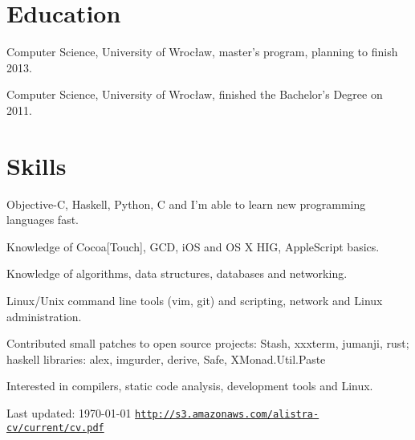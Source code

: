 \documentclass[letterpaper]{article}
\renewenvironment{itemize}{
  \begin{list}{}{
    \setlength{\leftmargin}{1.5em}
  }
}{
  \end{list}
}
\begin{document}
\section*{Education}

\begin{itemize}
  	\item Computer Science, University of Wrocław, master's program, planning to finish 2013.
  	\item Computer Science, University of Wrocław, finished the Bachelor's Degree on 2011.
\end{itemize}

\section*{Skills}

\begin{itemize}
	\item Objective-C, Haskell, Python, C and I'm able to learn new programming languages fast.
	\item Knowledge of Cocoa[Touch], GCD, iOS and OS X HIG, AppleScript basics.
	\item Knowledge of algorithms, data structures, databases and networking.
    \item Linux/Unix command line tools (vim, git) and scripting, network and Linux administration.
	\item Contributed small patches to open source projects: Stash, xxxterm, jumanji, rust;\\
		 haskell libraries: alex, imgurder, derive, Safe, XMonad.Util.Paste
	\item Interested in compilers, static code analysis, development tools and Linux.
\end{itemize}

\bigskip

\begin{center}
  \begin{footnotesize}
    Last updated: \today
    \hfill
    \href{http://s3.amazonaws.com/alistra-cv/current/cv.pdf}
    {\texttt{http://s3.amazonaws.com/alistra-cv/current/cv.pdf}}
  \end{footnotesize}
\end{center}
\end{document}
